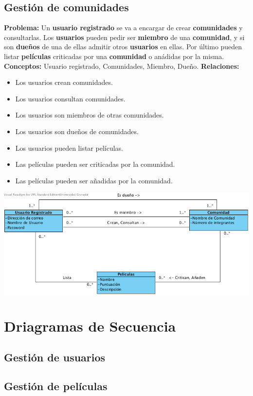 \documentclass{article}
\begin{document}
	\subsection*{Gestión de comunidades}
	\textbf{Problema:} Un \textbf{usuario registrado} se va a encargar de crear \textbf{comunidades} y consultarlas. Los \textbf{usuarios} pueden pedir ser \textbf{miembro} de una \textbf{comunidad}, y si son \textbf{dueños} de una de ellas admitir otros \textbf{usuarios} en ellas. Por último pueden listar \textbf{películas} criticadas por una \textbf{comunidad} o anádidas por la misma.\\
	\textbf{Conceptos:} Usuario registrado, Comunidades, Miembro, Dueño.
	\textbf{Relaciones:}
		\begin{itemize}
			\item Los usuarios crean comunidades.
			\item Los usuarios consultan comunidades.
			\item Los usuarios son miembros de otras comunidades.
			\item Los usuarios son dueños de comunidades.
			\item Los usuarios pueden listar películas.
			\item Las películas pueden ser criticadas por la comunidad.
			\item Las películas pueden ser añadidas por la comunidad.
		\end{itemize}
		\includegraphics[width=1\linewidth]{./C-Comunidades}
\section{Driagramas de Secuencia}
	\subsection*{Gestión de usuarios}
	\subsection*{Gestión de películas}
\end{document}
